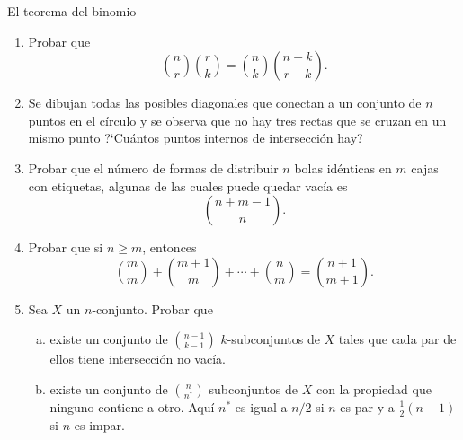 \begin{section}{El teorema del binomio}
\begin{enumerate}[1)]
\item Probar que
$$
\binom{n}{r}\binom{r}{k}=\binom{n}{k}\binom{n-k}{r-k}.
$$

\item Se dibujan todas las posibles diagonales que conectan a un conjunto de $n$
puntos en el círculo y se observa que no hay tres rectas que se cruzan en un
mismo punto ?`Cuántos puntos internos de intersección hay?

\item Probar que el número de formas de distribuir $n$ bolas idénticas en $m$
cajas con etiquetas, algunas de las cuales puede quedar vacía es
$$
\binom{n+m-1}{n}.
$$

\item Probar que si $n \ge m$, entonces
$$
\binom{m}{m}+\binom{m+1}{m}+\cdots+\binom{n}{m}=\binom{n+1}{m+1}.
$$

\item  Sea $X$ un $n$-conjunto. Probar que

\begin{enumerate}[a)]
	\item existe un conjunto de $\binom{n-1}{k-1}$ $k$-subconjuntos de
$X$ tales que cada par de ellos tiene intersección no vacía.

	\item existe un conjunto de $\binom{n}{n^*}$ subconjuntos de $X$ 
con la propiedad que ninguno contiene a otro. Aquí $n^*$ es igual
a $n/2$ si $n$ es par y a $\frac12(n-1)$ si $n$ es impar.
\end{enumerate}
\end{enumerate}

\end{section}

